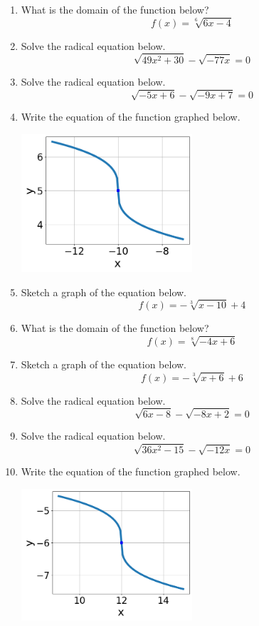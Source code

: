 \documentclass[14pt]{extbook}
\begin{document}
\begin{enumerate}
\item{
What is the domain of the function below?\[ f(x) = \sqrt[6]{6 x - 4} \]} \newpage
\item{
Solve the radical equation below.\[ \sqrt{49 x^2 + 30} - \sqrt{-77 x} = 0 \]} \newpage
\item{
Solve the radical equation below.\[ \sqrt{-5 x + 6} - \sqrt{-9 x + 7} = 0 \]} \newpage
\item{
Write the equation of the function graphed below.
\begin{center}
    \includegraphics[width=0.5\textwidth]{../Figures/radicalGraphToEquationC.png}
\end{center}
} \newpage
\item{
Sketch a graph of the equation below.\[ f(x) = - \sqrt[3]{x - 10} + 4 \]} \newpage
\item{
What is the domain of the function below?\[ f(x) = \sqrt[8]{-4 x + 6} \]} \newpage
\item{
Sketch a graph of the equation below.\[ f(x) = - \sqrt[3]{x + 6} + 6 \]} \newpage
\item{
Solve the radical equation below.\[ \sqrt{6 x - 8} - \sqrt{-8 x + 2} = 0 \]} \newpage
\item{
Solve the radical equation below.\[ \sqrt{36 x^2 - 15} - \sqrt{-12 x} = 0 \]} \newpage
\item{
Write the equation of the function graphed below.
\begin{center}
    \includegraphics[width=0.5\textwidth]{../Figures/radicalGraphToEquationCopyC.png}
\end{center}
} \newpage
\end{enumerate}
\end{document}
